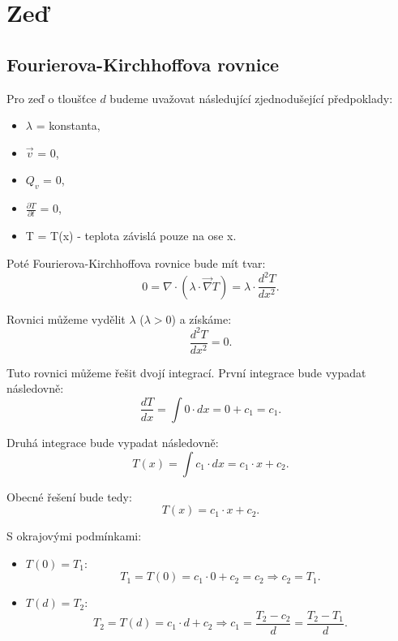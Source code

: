 \documentclass{article}
\begin{document}
\maketitle
\tableofcontents
\newpage



\section{ Zeď \spicy \spicy}


\subsection{Fourierova-Kirchhoffova rovnice \spicy \spicy \spicy}
Pro zeď o tloušťce $d$ budeme uvažovat následující zjednodušející předpoklady:
\begin{itemize}
    \item $\lambda$ = konstanta,
    \item $\vec{v}$ = 0,
    \item $Q_v$ = 0,
    \item $\frac{\partial T}{\partial t}$ = 0,
    \item T = T(x) - teplota závislá pouze na ose x.
\end{itemize}

Poté Fourierova-Kirchhoffova rovnice bude mít tvar:
$$
    0 = \nabla \cdot \left( \lambda \cdot \vec{\nabla} T \right) = \lambda \cdot \frac{d^2 T}{d x^2}.
$$

Rovnici můžeme vydělit $\lambda$ ($\lambda > 0$) a získáme:
$$
    \frac{d^2 T}{d x^2} = 0.
$$

Tuto rovnici můžeme řešit dvojí integrací. První integrace bude vypadat následovně:
$$
    \frac{d T}{d x} = \int 0 \cdot dx = 0 + c_1 = c_1.
$$

Druhá integrace bude vypadat následovně:
$$
    T(x) = \int c_1 \cdot dx = c_1 \cdot x + c_2.
$$

Obecné řešení bude tedy:
$$
    T(x) = c_1 \cdot x + c_2.
$$

S okrajovými podmínkami:
\begin{itemize}
    \item $T(0) = T_1$:
          $$
              T_1 = T(0) = c_1 \cdot 0 + c_2 = c_2 \Rightarrow c_2 = T_1.
          $$
    \item $T(d) = T_2$:
          $$
              T_2 = T(d) = c_1 \cdot d + c_2 \Rightarrow c_1 = \frac{T_2 - c_2}{d} = \frac{T_2 - T_1}{d}.
          $$
\end{itemize}
\end{document}
